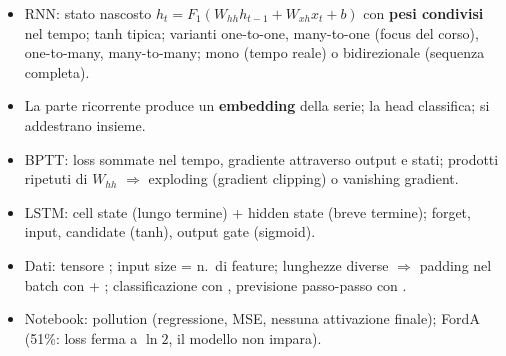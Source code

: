 \begin{sintesi}
\begin{itemize}
  \item RNN: stato nascosto $h_t = F_1(W_{hh}h_{t-1} + W_{xh}x_t + b)$ con \textbf{pesi condivisi} nel tempo; tanh tipica; varianti
        one-to-one, many-to-one (focus del corso), one-to-many, many-to-many; mono (tempo reale) o bidirezionale (sequenza completa).
  \item La parte ricorrente produce un \textbf{embedding} della serie; la head classifica; si addestrano insieme.
  \item BPTT: loss sommate nel tempo, gradiente attraverso output e stati; prodotti ripetuti di $W_{hh}$ $\Rightarrow$ exploding
        (gradient clipping) o vanishing gradient.
  \item LSTM: cell state (lungo termine) + hidden state (breve termine); forget, input, candidate (tanh), output gate (sigmoid).
  \item Dati: tensore ; input size = n.\ di feature; lunghezze diverse $\Rightarrow$ padding nel batch
        con  + ; classificazione con , previsione passo-passo con .
  \item Notebook: pollution (regressione, MSE, nessuna attivazione finale); FordA (51\%: loss ferma a $\ln 2$, il modello non impara).
\end{itemize}
\end{sintesi}
